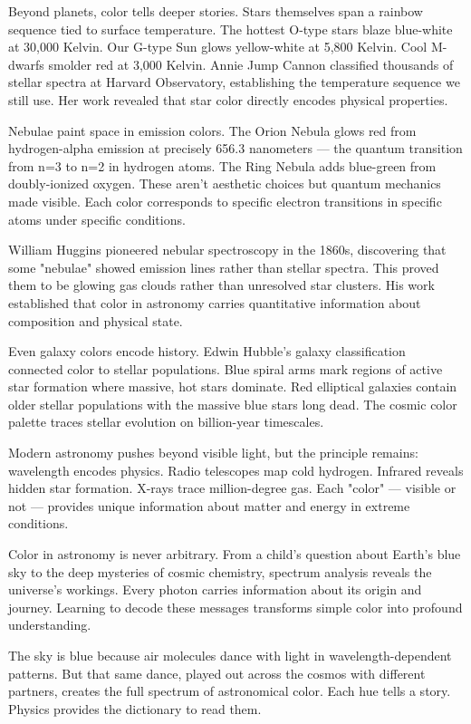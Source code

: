 Beyond planets, color tells deeper stories. Stars themselves span a rainbow sequence tied to surface temperature. The hottest O-type stars blaze blue-white at 30,000 Kelvin. Our G-type Sun glows yellow-white at 5,800 Kelvin. Cool M-dwarfs smolder red at 3,000 Kelvin. Annie Jump Cannon classified thousands of stellar spectra at Harvard Observatory, establishing the temperature sequence we still use. Her work revealed that star color directly encodes physical properties.

Nebulae paint space in emission colors. The Orion Nebula glows red from hydrogen-alpha emission at precisely 656.3 nanometers — the quantum transition from n=3 to n=2 in hydrogen atoms. The Ring Nebula adds blue-green from doubly-ionized oxygen. These aren't aesthetic choices but quantum mechanics made visible. Each color corresponds to specific electron transitions in specific atoms under specific conditions.

William Huggins pioneered nebular spectroscopy in the 1860s, discovering that some "nebulae" showed emission lines rather than stellar spectra. This proved them to be glowing gas clouds rather than unresolved star clusters. His work established that color in astronomy carries quantitative information about composition and physical state.

Even galaxy colors encode history. Edwin Hubble's galaxy classification connected color to stellar populations. Blue spiral arms mark regions of active star formation where massive, hot stars dominate. Red elliptical galaxies contain older stellar populations with the massive blue stars long dead. The cosmic color palette traces stellar evolution on billion-year timescales.

Modern astronomy pushes beyond visible light, but the principle remains: wavelength encodes physics. Radio telescopes map cold hydrogen. Infrared reveals hidden star formation. X-rays trace million-degree gas. Each "color" — visible or not — provides unique information about matter and energy in extreme conditions.

Color in astronomy is never arbitrary. From a child's question about Earth's blue sky to the deep mysteries of cosmic chemistry, spectrum analysis reveals the universe's workings. Every photon carries information about its origin and journey. Learning to decode these messages transforms simple color into profound understanding.

The sky is blue because air molecules dance with light in wavelength-dependent patterns. But that same dance, played out across the cosmos with different partners, creates the full spectrum of astronomical color. Each hue tells a story. Physics provides the dictionary to read them.
